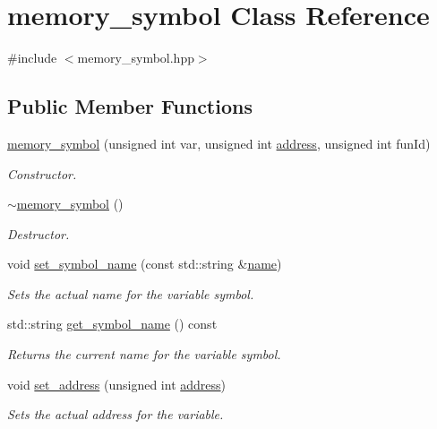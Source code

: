 \hypertarget{classmemory__symbol}{}\section{memory\+\_\+symbol Class Reference}
\label{classmemory__symbol}


{\ttfamily \#include $<$memory\+\_\+symbol.\+hpp$>$}

\subsection*{Public Member Functions}
\begin{DoxyCompactItemize}
\item 
\hyperlink{classmemory__symbol_af5aff6a6fc83b0d8db9b26c91c2f8784}{memory\+\_\+symbol} (unsigned int var, unsigned int \hyperlink{classmemory__symbol_a2d83272ca53bd6831a35d9d99539bd09}{address}, unsigned int fun\+Id)
\begin{DoxyCompactList}\small\item\em Constructor. \end{DoxyCompactList}\item 
\hyperlink{classmemory__symbol_a28f05edf5ec3bea7bb70972dd4fbd265}{$\sim$memory\+\_\+symbol} ()
\begin{DoxyCompactList}\small\item\em Destructor. \end{DoxyCompactList}\item 
void \hyperlink{classmemory__symbol_ad8e132a569edcf7123101965d45b103a}{set\+\_\+symbol\+\_\+name} (const std\+::string \&\hyperlink{classmemory__symbol_ae7444e39e5bb0fdf24f8779507c66833}{name})
\begin{DoxyCompactList}\small\item\em Sets the actual name for the variable symbol. \end{DoxyCompactList}\item 
std\+::string \hyperlink{classmemory__symbol_a3846fec2895c18601c8a870510e36def}{get\+\_\+symbol\+\_\+name} () const
\begin{DoxyCompactList}\small\item\em Returns the current name for the variable symbol. \end{DoxyCompactList}\item 
void \hyperlink{classmemory__symbol_ab7f217285d6047eaaaa0a2baa1a5ea18}{set\+\_\+address} (unsigned int \hyperlink{classmemory__symbol_a2d83272ca53bd6831a35d9d99539bd09}{address})
\begin{DoxyCompactList}\small\item\em Sets the actual address for the variable. \end{DoxyCompactList}\item 

\end{DoxyCompactItemize}
